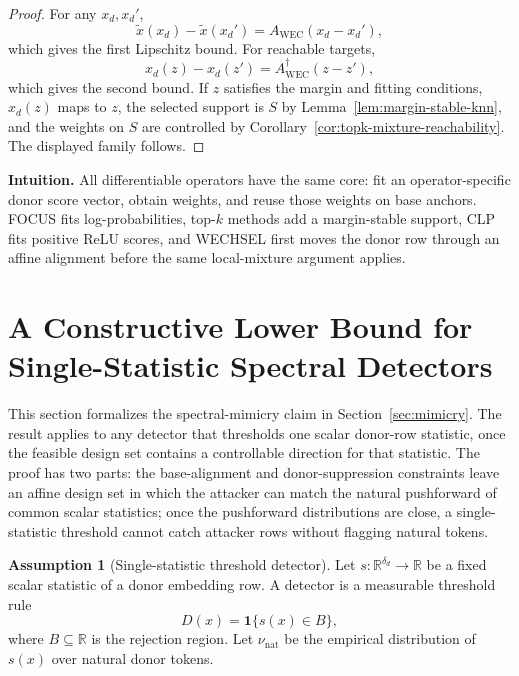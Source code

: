 \documentclass{article}
\theoremstyle{plain}
\theoremstyle{definition}
\newtheorem{assumption}[theorem]{Assumption}
\theoremstyle{remark}
\begin{document}
\begin{proof}
For any $x_d,x_d'$,
\[
\widetilde{x}(x_d)-\widetilde{x}(x_d')=A_{\mathrm{WEC}}(x_d-x_d'),
\]
which gives the first Lipschitz bound. For reachable targets,
\[
x_d(z)-x_d(z')=A_{\mathrm{WEC}}^\dagger(z-z'),
\]
which gives the second bound. If $z$ satisfies the margin and fitting conditions, $x_d(z)$ maps to $z$, the selected support is $S$ by Lemma~\ref{lem:margin-stable-knn}, and the weights on $S$ are controlled by Corollary~\ref{cor:topk-mixture-reachability}. The displayed family follows.
\end{proof}

\noindent\textbf{Intuition.}
All differentiable operators have the same core: fit an operator-specific donor score vector, obtain weights, and reuse those weights on base anchors. FOCUS fits log-probabilities, top-$k$ methods add a margin-stable support, CLP fits positive ReLU scores, and WECHSEL first moves the donor row through an affine alignment before the same local-mixture argument applies.

\section{A Constructive Lower Bound for Single-Statistic Spectral Detectors}
\label{app:spectral-detector-lower-bound}

This section formalizes the spectral-mimicry claim in Section~\ref{sec:mimicry}. The result applies to any detector that thresholds one scalar donor-row statistic, once the feasible design set contains a controllable direction for that statistic. The proof has two parts: the base-alignment and donor-suppression constraints leave an affine design set in which the attacker can match the natural pushforward of common scalar statistics; once the pushforward distributions are close, a single-statistic threshold cannot catch attacker rows without flagging natural tokens.

\begin{assumption}[Single-statistic threshold detector]
\label{ass:single-statistic-threshold}
Let $s:\mathbb{R}^{\delta_d}\to\mathbb{R}$ be a fixed scalar statistic of a donor embedding row. A detector is a measurable threshold rule
\[
D(x)=\mathbf{1}\{s(x)\in B\},
\]
where $B\subseteq\mathbb{R}$ is the rejection region. Let $\nu_{\mathrm{nat}}$ be the empirical distribution of $s(x)$ over natural donor tokens.
\end{assumption}
\end{document}
